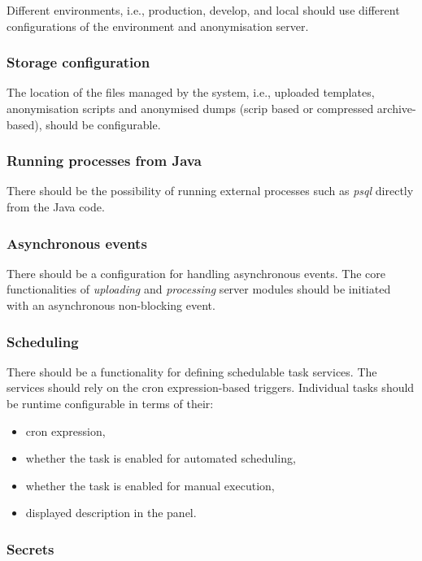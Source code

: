 \documentclass[a4paper,twoside,12pt]{book}
\begin{document}
Different environments, i.e., production, develop, and local should use different configurations of the environment and anonymisation server.

\subsubsection{Storage configuration}

The location of the files managed by the system, i.e., uploaded templates, anonymisation scripts and anonymised dumps (scrip based or compressed archive-based), should be configurable.

\subsubsection{Running processes from Java}

There should be the possibility of running external processes such as \textit{psql} directly from the Java code.

\subsubsection{Asynchronous events}

There should be a configuration for handling asynchronous events. The core functionalities of \textit{uploading} and \textit{processing} server modules should be initiated with an asynchronous non-blocking event.

\subsubsection{Scheduling}

There should be a functionality for defining schedulable task services. The services should rely on the cron expression-based triggers. Individual tasks should be runtime configurable in terms of their:

\begin{itemize}
\item cron expression,
\item whether the task is enabled for automated scheduling,
\item whether the task is enabled for manual execution,
\item displayed description in the panel.
\end{itemize}

\subsubsection{Secrets}
\end{document}
